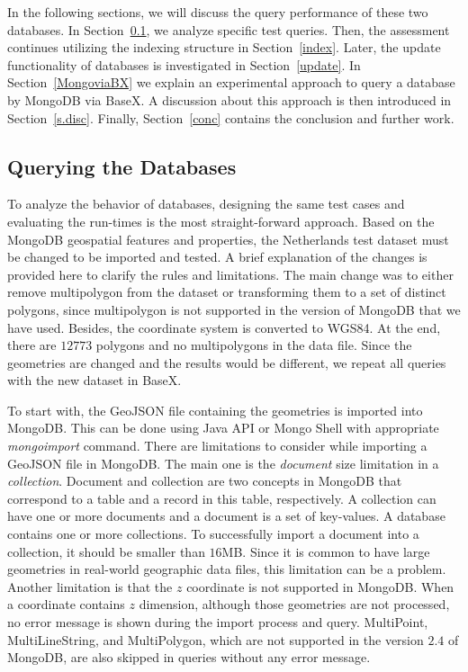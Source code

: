 \documentclass[a4paper,12pt]{article}
\begin{document}
In the following sections, we will discuss the query performance of these two databases. 
In Section~\ref{s.query}, we analyze specific test queries. Then, the assessment continues
utilizing the indexing structure in Section~\ref{index}. Later, the update functionality of databases is 
investigated in Section~\ref{update}. In Section~\ref{MongoviaBX} we explain an experimental approach to query a database by MongoDB via BaseX. A discussion about this approach is then introduced in Section~\ref{s.disc}. Finally, Section~\ref{conc} contains the conclusion and further work.

\subsection{Querying the Databases}
\label{s.query}
To analyze the behavior of databases, designing the same test cases and evaluating the run-times is the most straight-forward approach. Based on the MongoDB geo\-spatial features and properties, the Netherlands test dataset must be changed to be imported and tested. A brief explanation of the changes is provided here to clarify the rules and limitations. The main change was to either remove multipolygon from the dataset or transforming them to a set of distinct polygons, since multipolygon is not supported in the version of MongoDB that we have used. Besides, the coordinate system is converted to WGS84. At the end, there are $12773$ polygons and no multipolygons in the data file. Since the geometries are changed and the results would be different, we repeat all queries with the new dataset in BaseX.

To start with, the GeoJSON file containing the geometries is imported into MongoDB. This can be done  using Java API or Mongo Shell with appropriate \textit{mongo\-import} command. There are limitations to consider while importing a GeoJSON file in MongoDB. The main one is the \textit{document} size limitation in a \textit{collection}. Document and collection are two concepts in MongoDB that correspond to a table and a record in this table, respectively. A collection can have one or more documents and a document is a set of key-values. A database contains one or more collections. To successfully import a document into a collection, it should be smaller than $16$MB. Since it is common to have large geometries in real-world geographic data files, this limitation can be a problem. Another limitation is that the $z$ coordinate is not supported in MongoDB. When a coordinate contains $z$ dimension, although those geometries are not processed, no error message is shown during the import process and query. Multi\-Point, Multi\-Line\-String, and Multi\-Polygon, which are not supported in the version $2.4$ of MongoDB, are also skipped in queries without any error message. 
\end{document}
